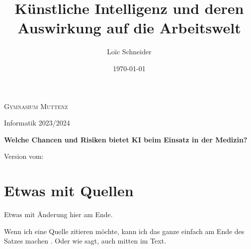 \documentclass{report}
\title{Künstliche Intelligenz und deren Auswirkung auf die Arbeitswelt}
\author{Loïc Schneider}
\date{\today}
\begin{document}
\begin{titlepage}
    \makeatletter %
	\begin{center}
		{\scshape Gymnasium Muttenz} \vspace{0.5cm}

		 Informatik 2023/2024\vspace{5.5cm}

		{\huge\bfseries \@title} 

        \vspace{1cm}

        {\Large\bfseries Welche Chancen und Risiken bietet KI beim Einsatz in der Medizin?}

        \vspace{2cm}

		\vspace{2cm}

		{\Large\itshape \@author}

        \vspace{2cm}

        Version vom: \@date
	\end{center}
    
    \makeatother %
\end{titlepage}

\tableofcontents











\section{Etwas mit Quellen}

Etwas mit Änderung hier am Ende.

Wenn ich eine Quelle zitieren möchte, kann ich das ganze einfach am Ende des Satzes machen \citep{example}. Oder wie \citet{example} sagt, auch mitten im Text.

\printbibliography
\end{document}
